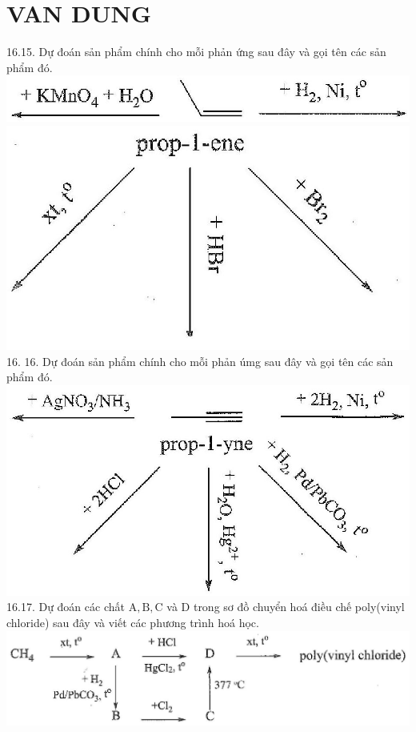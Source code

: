 \documentclass[10pt]{article}
\begin{document}
\section*{VAN DUNG}
16.15. Dự đoán sản phẩm chính cho mỗi phản ứng sau đây và gọi tên các sản phẩm đó.\\
\includegraphics[max width=\textwidth, center]{2025_10_23_fa9073eecee116ad8cf2g-55}\\
\includegraphics[max width=\textwidth, center]{2025_10_23_fa9073eecee116ad8cf2g-55(1)}\\
16. 16. Dự đoán sản phẩm chính cho mỗi phản úmg sau đây và gọi tên các sản phẩm đó.\\
\includegraphics[max width=\textwidth, center]{2025_10_23_fa9073eecee116ad8cf2g-56}\\
16.17. Dự đoán các chất $\mathrm{A}, \mathrm{B}, \mathrm{C}$ và D trong sơ đồ chuyển hoá điều chế poly(vinyl chloride) sau đây và viết các phương trình hoá học.\\
\includegraphics[max width=\textwidth, center]{2025_10_23_fa9073eecee116ad8cf2g-56(1)}
\end{document}
